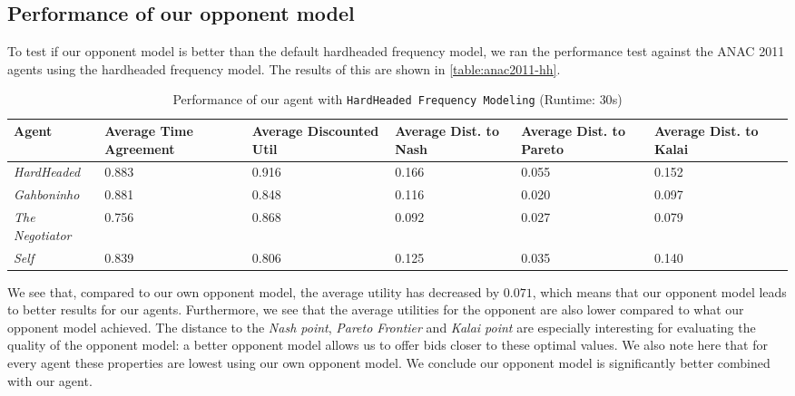 \subsection{Performance of our opponent model}
To test if our opponent model is better than the default hardheaded frequency model, we ran the performance test against the ANAC 2011 agents using the hardheaded frequency model. The results of this are shown in \autoref{table:anac2011-hh}.
\begin{table}[H]
	\centering
	\small
    \begin{tabular}{m{2cm}m{2cm}m{2cm}m{2cm}m{2cm}m{2cm}m{2cm}}
    \toprule
    Agent              & Average Time Agreement & Average Discounted Util & Average Dist. to Nash & Average Dist. to Pareto & Average Dist. to Kalai \\
    \midrule
    \emph{HardHeaded}		& 0.883  & 0.916  & 0.166  & 0.055  & 0.152   \\ 
    \emph{Gahboninho}   	& 0.881  & 0.848  & 0.116  & 0.020  & 0.097   \\ 
    \emph{The Negotiator} 	& 0.756  & 0.868  & 0.092  & 0.027  & 0.079   \\ 
    \emph{Self}                 & 0.839  & 0.806  & 0.125  & 0.035  & 0.140   \\ 
    \bottomrule
    \end{tabular}
    \caption{Performance of our agent with \texttt{HardHeaded Frequency Modeling} (Runtime: $30$s) \label{table:anac2011-hh}}
\end{table}
We see that, compared to our own opponent model, the average utility has decreased by $0.071$, which means that our opponent model leads to  better results for our agents. 
Furthermore, we see that the average utilities for the opponent are also lower compared to what our opponent model achieved.
The distance to the \emph{Nash point}, \emph{Pareto Frontier} and \emph{Kalai point} are especially interesting for evaluating the quality of the opponent model: a better opponent model allows us to offer bids closer to these optimal values. We also note here that for every agent these properties are lowest using our own opponent model.
We conclude our opponent model is significantly better combined with our agent.

